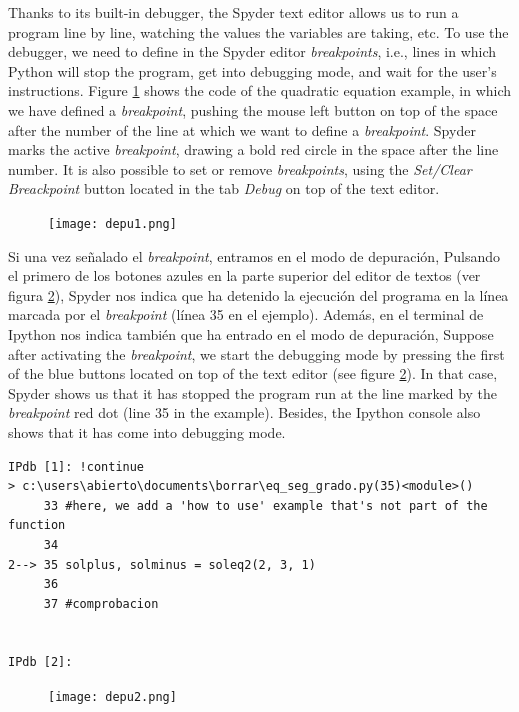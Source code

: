 \begin{paracol}{2}
Thanks to its built-in debugger, the Spyder text editor allows us to run a program line by line, watching the values the variables are taking, etc. To use the debugger, we need to define in the Spyder editor \emph{breakpoints}, i.e., lines in which Python will stop the program, get into debugging mode, and wait for the user's instructions. Figure \ref{fig:depu1} shows the code of the quadratic equation example, in which we have defined a \emph{breakpoint}, pushing the mouse left button on top of the space after the number of the line at which we want to define a \emph{breakpoint}. Spyder marks the active \emph{breakpoint}, drawing a bold red circle in the space after the line number. It is also possible to set or remove \emph{breakpoints}, using the \emph{Set/Clear Breackpoint} button located in the tab \emph{Debug} on top of the text editor.
\end{paracol}

\begin{figure}
\centering
\texttt{[image: depu1.png]}
\label{fig:depu1}
\end{figure}

\begin{paracol}{2}
Si una vez señalado el \emph{breakpoint},  entramos en el modo de depuración, Pulsando el primero de los botones azules en la parte superior del editor de textos (ver figura \ref{fig:depu2}),
Spyder nos indica que ha detenido la ejecución del programa en la línea marcada por el \emph{breakpoint} (línea 35 en el ejemplo). Además, en el terminal de Ipython nos indica también que ha entrado en el modo de depuración,
\switchcolumn
Suppose after activating the \emph{breakpoint}, we start the debugging mode by pressing the first of the blue buttons located on top of the text editor (see figure \ref{fig:depu2}). In that case, Spyder shows us that it has stopped the program run at the line marked by the \emph{breakpoint} red dot (line 35 in the example). Besides, the Ipython console also shows that it has come into debugging mode.
\end{paracol}
\begin{verbatim}
IPdb [1]: !continue
> c:\users\abierto\documents\borrar\eq_seg_grado.py(35)<module>()
     33 #here, we add a 'how to use' example that's not part of the function
     34 
2--> 35 solplus, solminus = soleq2(2, 3, 1)
     36 
     37 #comprobacion


IPdb [2]: 
\end{verbatim}
\begin{figure}
\centering
\texttt{[image: depu2.png]}
\label{fig:depu2}
\end{figure}

